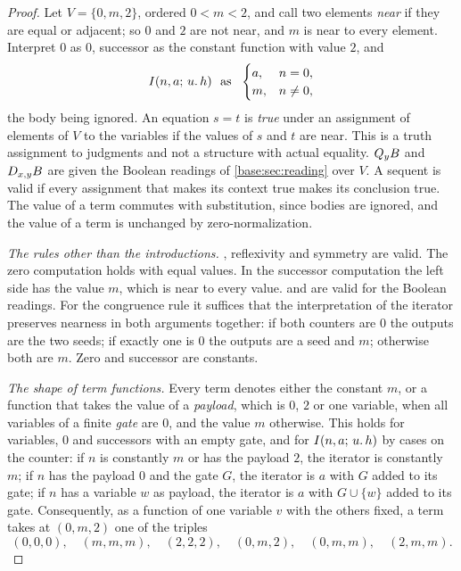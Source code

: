 \begin{proof}
Let $V=\{0,m,2\}$, ordered $0<m<2$, and call two elements \emph{near} if
they are equal or adjacent; so $0$ and $2$ are not near, and $m$ is near
to every element. Interpret $0$ as $0$, successor as the constant function
with value $2$, and
\[
 I(n,a;\,u.\,h)\ \text{ as }\
 \begin{cases}a,&n=0,\\ m,&n\neq 0,\end{cases}
\]
the body being ignored. An equation $s=t$ is \emph{true} under an
assignment of elements of $V$ to the variables if the values of $s$ and
$t$ are near. This is a truth assignment to judgments and not a structure
with actual equality. $Q_{y}B$ and $D_{x,y}B$ are given the Boolean
readings of \cref{base:sec:reading} over $V$. A sequent is valid if every
assignment that makes its context true makes its conclusion true. The
value of a term commutes with substitution, since bodies are ignored, and
the value of a term is unchanged by zero-normalization.

\emph{The rules other than the introductions.} ,
reflexivity and symmetry are valid. The zero computation holds with equal
values. In the successor computation the left side has the value $m$,
which is near to every value. \rulename{QE} and \rulename{DE} are valid
for the Boolean readings. For the congruence rule it suffices that the
interpretation of the iterator preserves nearness in both arguments
together: if both counters are $0$ the outputs are the two seeds; if
exactly one is $0$ the outputs are a seed and $m$; otherwise both are $m$.
Zero and successor are constants.

\emph{The shape of term functions.} Every term denotes either the constant
$m$, or a function that takes the value of a \emph{payload}, which is $0$,
$2$ or one variable, when all variables of a finite \emph{gate} are $0$,
and the value $m$ otherwise. This holds for variables, $0$ and successors
with an empty gate, and for $I(n,a;\,u.\,h)$ by cases on the counter: if
$n$ is constantly $m$ or has the payload $2$, the iterator is constantly
$m$; if $n$ has the payload $0$ and the gate $G$, the iterator is $a$ with
$G$ added to its gate; if $n$ has a variable $w$ as payload, the iterator
is $a$ with $G\cup\{w\}$ added to its gate. Consequently, as a function of
one variable $v$ with the others fixed, a term takes at $(0,m,2)$ one of
the triples
\[
 (0,0,0),\quad(m,m,m),\quad(2,2,2),\quad(0,m,2),\quad(0,m,m),\quad(2,m,m).
\]


\end{proof}
